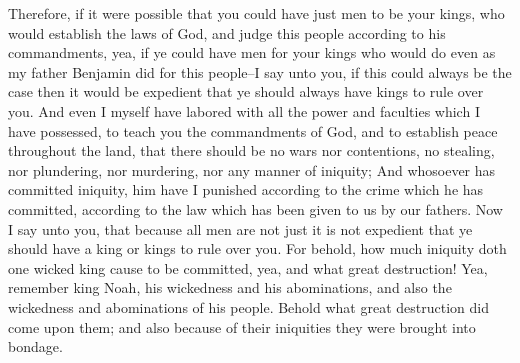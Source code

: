 Therefore, if it were possible that you could have just men to be your kings, who would establish the laws of God, and judge this people according to his commandments, yea, if ye could have men for your kings who would do even as my father Benjamin did for this people--I say unto you, if this could always be the case then it would be expedient that ye should always have kings to rule over you.
\bverse \iffalse And even I myself have labored with all the power and faculties which I have possessed, to teach you the commandments of God, and to establish peace throughout the land, that there should be no wars nor contentions, no stealing, nor plundering, nor murdering, nor any manner of iniquity; \fi
And even I myself have labored with all the power and faculties which I have possessed, to teach you the commandments of God, and to establish peace throughout the land, that there should be no wars nor contentions, no stealing, nor plundering, nor murdering, nor any manner of iniquity;
\bverse \iffalse And whosoever has committed iniquity, him have I punished according to the crime which he has committed, according to the law which has been given to us by our fathers. \fi
And whosoever has committed iniquity, him have I punished according to the crime which he has committed, according to the law which has been given to us by our fathers.
\bverse \iffalse Now I say unto you, that because all men are not just it is not expedient that ye should have a king or kings to rule over you. \fi
Now I say unto you, that because all men are not just it is not expedient that ye should have a king or kings to rule over you.
\bverse \iffalse For behold, how much iniquity doth one wicked king cause to be committed, yea, and what great destruction! \fi
For behold, how much iniquity doth one wicked king cause to be committed, yea, and what great destruction!
\bverse \iffalse Yea, remember king Noah, his wickedness and his abominations, and also the wickedness and abominations of his people. Behold what great destruction did come upon them; and also because of their iniquities they were brought into bondage. \fi
Yea, remember king Noah, his wickedness and his abominations, and also the wickedness and abominations of his people. Behold what great destruction did come upon them; and also because of their iniquities they were brought into bondage.
\bverse \iffalse And were it not for the interposition of their all-wise Creator, and this because of their sincere repentance, they must unavoidably remain in bondage until now. \fi
